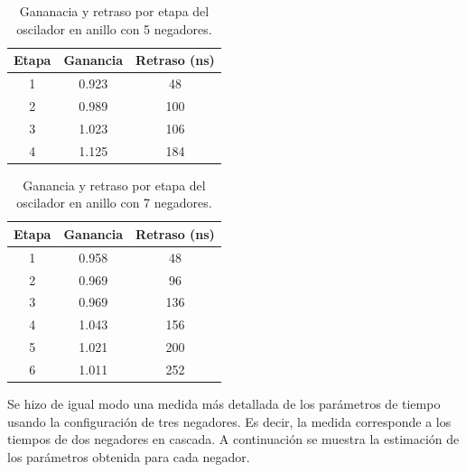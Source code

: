 \documentclass[twocolumn]{IEEEtran}
\begin{document}
\begin{table}[h]
	\renewcommand{\arraystretch}{1.1}
	\caption{Gananacia y retraso  por etapa del oscilador en anillo con 5 negadores.}
	\label{p4t2}
	\centering
	\begin{tabular}{|c|c|c|}%
	\hline
	\bf Etapa & \bf Ganancia & \bf Retraso (ns) \\
	\hline
	1 & 0.923 & 48 \\
	\hline
	2 & 0.989 & 100 \\
	\hline
	3 & 1.023 & 106 \\
	\hline
	4 & 1.125 & 184 \\
	\hline
	\end{tabular}
\end{table}

\begin{table}[H]
	\renewcommand{\arraystretch}{1.1}
	\caption{Ganancia y retraso  por etapa del oscilador en anillo con 7 negadores.}
	\label{p4t3}
	\centering
	\begin{tabular}{|c|c|c|}
	\hline
	\bf Etapa & \bf Ganancia & \bf Retraso (ns) \\
	\hline
	1 & 0.958 & 48 \\
	\hline
	2 & 0.969 & 96 \\
	\hline
	3 & 0.969 & 136\\
	\hline
	4 & 1.043 & 156 \\
	\hline
	5 & 1.021 & 200 \\
	\hline
	6 & 1.011 & 252 \\
	\hline
	\end{tabular}
\end{table}

Se hizo de igual modo una medida más detallada de los parámetros de tiempo usando la configuración de tres negadores. Es decir, la medida corresponde a los tiempos de dos negadores en cascada. A continuación se muestra la estimación de los parámetros obtenida para cada negador.
\end{document}
